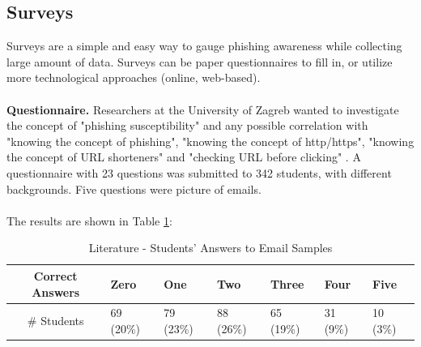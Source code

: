 \documentclass[a4paper]{article}
\begin{document}
\subsection{Surveys}

Surveys are a simple and easy way to gauge phishing awareness while collecting large amount of data. Surveys can be paper questionnaires to fill in, or utilize more technological approaches (online, web-based).
\\ \\
\textbf{Questionnaire.} Researchers at the University of Zagreb wanted to investigate the concept of "phishing susceptibility" and any possible correlation with "knowing the concept of phishing", "knowing the concept of http/https", "knowing the concept of URL shorteners" and "checking URL before clicking" \cite{lit-casestudy-students}. A questionnaire with 23 questions was submitted to 342 students, with different backgrounds. Five questions were picture of emails.
\\ \\
The results are shown in Table \ref{tb-lit1}:

\smallskip

\begingroup
\renewcommand{\arraystretch}{1.25}
\begin{table}[ht]
\begin{center}
    \begin{tabular}{ | c | l | l | l | l | l | l | }
    \hline
    \textbf{Correct Answers} & \textbf{Zero} & \textbf{One} & \textbf{Two} & \textbf{Three} & \textbf{Four} & \textbf{Five} \\ \hline
    \# Students & 69 (20\%) & 79 (23\%) & 88 (26\%) & 65 (19\%) & 31 (9\%) & 10 (3\%) \\ \hline
    \end{tabular}
\end{center}
\caption{Literature - Students' Answers to Email Samples \cite{lit-casestudy-students}}
\label{tb-lit1}
\end{table}
\endgroup
\end{document}
